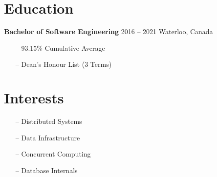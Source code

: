 \documentclass{resume}
\begin{document}
\begin{sidebar}
    \section{Education}
      \color{tagText}\textbf{Bachelor of Software Engineering}
      \color{tagText}2016 -- 2021 \separator\color{tagText}Waterloo, Canada
      \color{bodyText}%
      \begin{itemize}[leftmargin=0.45cm, noitemsep, topsep=0.0cm]%
        \item[--] 93.15\% Cumulative Average
        \item[--] Dean's Honour List (3 Terms)
      \end{itemize}%
    \section{Interests}
      \begin{itemize}[leftmargin=0.45cm, noitemsep, topsep=0.0cm]%
        \item[--] Distributed Systems
        \item[--] Data Infrastructure
        \item[--] Concurrent Computing
        \item[--] Database Internals
      \end{itemize}%
  \end{sidebar}
\end{document}
